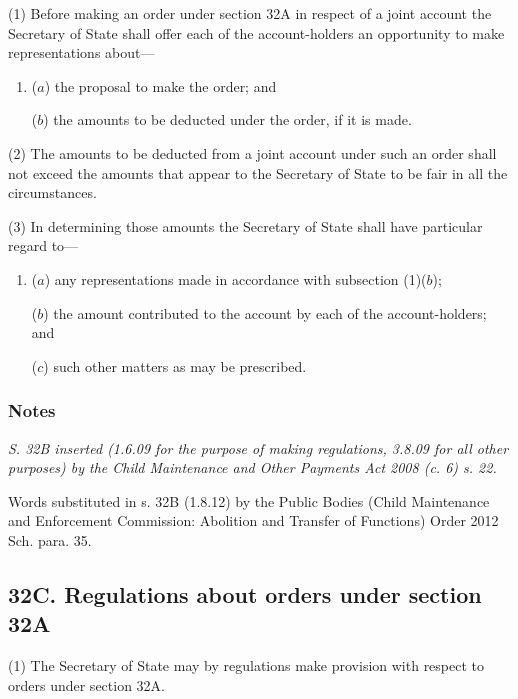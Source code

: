 \documentclass[a4paper]{article}
\newcommand\amendment[1]{\subsubsection*{Notes}{\itshape\frenchspacing\footnotesize #1 \par}}
\begin{document}
(1) Before making an order under section 32A in respect of a joint account 
the Secretary of State shall offer each of the account-holders an opportunity to make representations about---
\begin{enumerate}\item[]
($a$) the proposal to make the order; and

($b$) the amounts to be deducted under the order, if it is made.
\end{enumerate}

(2)
The amounts to be deducted from a joint account under such an order shall not exceed the amounts that appear to the Secretary of State to be fair in all the circumstances.

(3)
In determining those amounts the Secretary of State shall have particular regard to---
\begin{enumerate}\item[]
($a$) any representations made in accordance with subsection (1)($b$);

($b$) the amount contributed to the account by each of the account-holders; and

($c$) such other matters as may be prescribed.
\end{enumerate}

\amendment{
S. 32B inserted (1.6.09 for the purpose of making regulations, 3.8.09 for all other purposes) by the Child Maintenance and Other Payments Act 2008 (c. 6)
s. 22.

Words substituted in s. 32B (1.8.12) by the Public Bodies (Child Maintenance and Enforcement Commission: Abolition and Transfer of Functions) Order 2012 Sch. para. 35.
}

\subsection{32C. Regulations about orders under section 32A}

(1) The Secretary of State may by regulations make provision with respect
to orders under section 32A.
\end{document}
